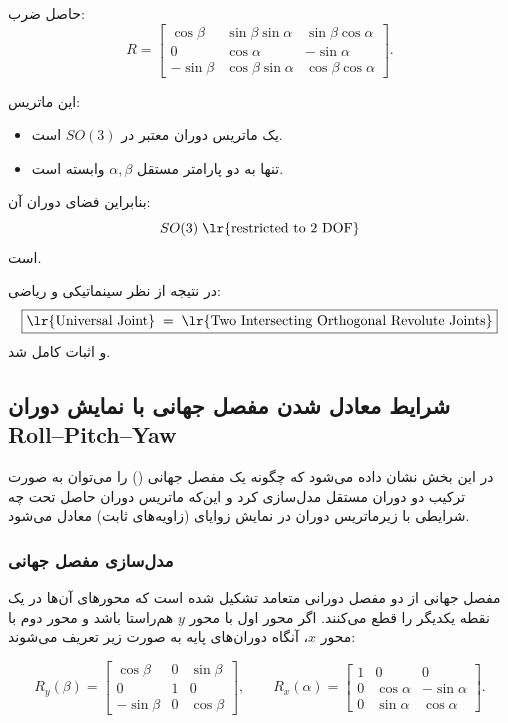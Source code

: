 \documentclass{article}
\begin{document}
حاصل ضرب:
\[
R=
\begin{bmatrix}
	\cos\beta & \sin\beta\sin\alpha & \sin\beta\cos\alpha\\[4pt]
	0 & \cos\alpha & -\sin\alpha\\[4pt]
	-\sin\beta & \cos\beta\sin\alpha & \cos\beta\cos\alpha
\end{bmatrix}.
\]

این ماتریس:
\begin{itemize}
	\item یک ماتریس دوران معتبر در \(SO(3)\) است.
	\item تنها به دو پارامتر مستقل \(\alpha,\beta\) وابسته است.
\end{itemize}

بنابراین فضای دوران آن:
\[
SO(3)\;\text{\lr{restricted to 2 DOF}}
\]
است.

در نتیجه از نظر سینماتیکی و ریاضی:
\[
\boxed{
	\text{\lr{Universal Joint}} \;=\; \text{\lr{Two Intersecting Orthogonal Revolute Joints}}
}
\]
و اثبات کامل شد.

\subsection{شرایط معادل شدن مفصل جهانی با نمایش دوران Roll--Pitch--Yaw}

در این بخش نشان داده می‌شود که چگونه یک مفصل جهانی () را می‌توان به صورت ترکیب دو دوران مستقل مدل‌سازی کرد و این‌که ماتریس دوران حاصل تحت چه شرایطی با زیرماتریس دوران در نمایش زوایای  (زاویه‌های ثابت) معادل می‌شود.

\subsubsection{مدل‌سازی مفصل جهانی}

مفصل جهانی از دو مفصل دورانی متعامد تشکیل شده است که محورهای آن‌ها در یک نقطه یکدیگر را قطع می‌کنند. اگر محور اول با محور \(y\) هم‌راستا باشد و محور دوم با محور \(x\)، آنگاه دوران‌های پایه به صورت زیر تعریف می‌شوند:

\[
R_y(\beta)=
\begin{bmatrix}
	\cos\beta & 0 & \sin\beta\\
	0 & 1 & 0\\
	-\sin\beta & 0 & \cos\beta
\end{bmatrix},\qquad
R_x(\alpha)=
\begin{bmatrix}
	1 & 0 & 0\\
	0 & \cos\alpha & -\sin\alpha\\
	0 & \sin\alpha & \cos\alpha
\end{bmatrix}.
\]
\end{document}
